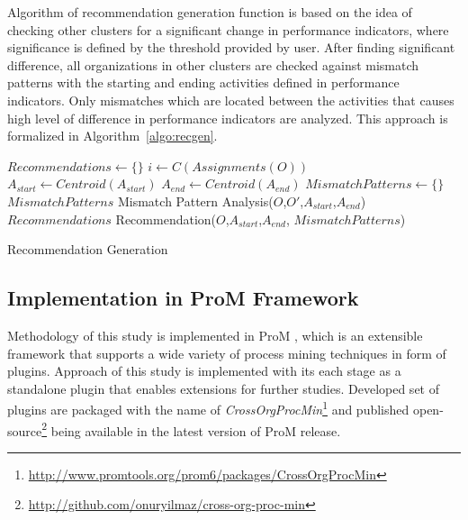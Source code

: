 Algorithm of recommendation generation function is based on the idea of checking other clusters for a significant change in performance indicators, where significance is defined by the threshold provided by user. After finding significant difference, all organizations in other clusters are checked against mismatch patterns with the starting and ending activities defined in performance indicators. Only mismatches which are located between the activities that causes high level of difference in performance indicators are analyzed. This approach is formalized in Algorithm~\ref{algo:recgen}.
 \begin{algorithm}
\DontPrintSemicolon %
$Recommendations \leftarrow \{\}$ \;
$i \leftarrow C(Assignments(O))$ \;
 { 
   { 
     {
       {
        $A_{start} \leftarrow Centroid(A_{start})$ \;
        $A_{end} \leftarrow Centroid(A_{end})$ \;
        $MismatchPatterns \leftarrow \{\}$ \;
         {
          $MismatchPatterns$ \leftarrow  Mismatch Pattern Analysis($O$,$O'$,$A_{start}$,$A_{end}$) \;
        }
        $Recommendations$ \leftarrow  Recommendation($O$,$A_{start}$,$A_{end}$, $MismatchPatterns$) \;
      }
    }
  }
}
 \;
\caption{Recommendation Generation}
\label{algo:recgen}
\end{algorithm}

\subsection{Implementation in ProM Framework}
\label{subsec:implementation}
Methodology of this study is implemented in ProM \cite{verbeek2010prom}, which is an extensible framework that supports a wide variety of process mining techniques in form of plugins. Approach of this study is implemented with its each stage as a standalone plugin that enables extensions for further studies. Developed set of plugins are packaged with the name of \textit{CrossOrgProcMin}\footnote{\url{http://www.promtools.org/prom6/packages/CrossOrgProcMin}} and published open-source\footnote{\url{http://github.com/onuryilmaz/cross-org-proc-min}} being available in the latest version of ProM release.